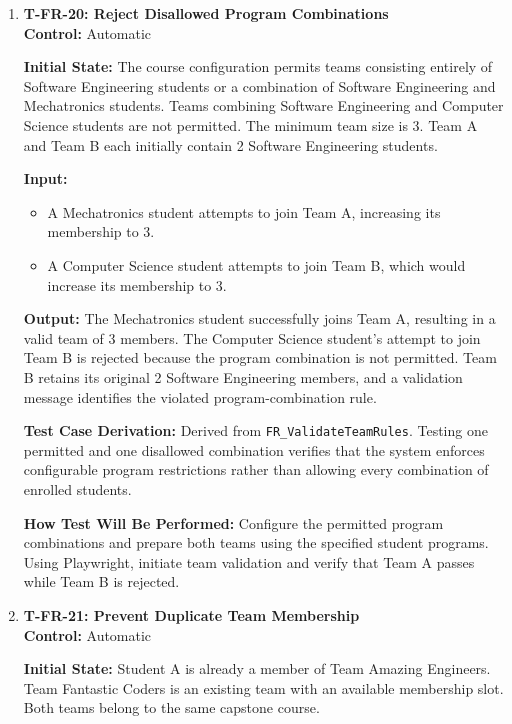 \documentclass[12pt, titlepage]{article}
\begin{document}
\begin{enumerate}
\item \label{T-FR-20}\textbf{T-FR-20: Reject Disallowed Program Combinations}\\

\textbf{Control:} Automatic

\textbf{Initial State:} The course configuration permits teams consisting entirely of Software Engineering students or a combination of Software Engineering and Mechatronics students. Teams combining Software Engineering and Computer Science students are not permitted. The minimum team size is 3. Team A and Team B each initially contain 2 Software Engineering students.

\textbf{Input:}
\begin{itemize}
    \item A Mechatronics student attempts to join Team A, increasing its membership to 3.
    \item A Computer Science student attempts to join Team B, which would increase its membership to 3.
\end{itemize}

\textbf{Output:} The Mechatronics student successfully joins Team A, resulting in a valid team of 3 members. The Computer Science student's attempt to join Team B is rejected because the program combination is not permitted. Team B retains its original 2 Software Engineering members, and a validation message identifies the violated program-combination rule.

\textbf{Test Case Derivation:} Derived from \texttt{FR\_ValidateTeamRules}. Testing one permitted and one disallowed combination verifies that the system enforces configurable program restrictions rather than allowing every combination of enrolled students.

\textbf{How Test Will Be Performed:} Configure the permitted program combinations and prepare both teams using the specified student programs. Using Playwright, initiate team validation and verify that Team A passes while Team B is rejected.

\item \label{T-FR-21}\textbf{T-FR-21: Prevent Duplicate Team Membership}\\

\textbf{Control:} Automatic

\textbf{Initial State:} Student A is already a member of Team Amazing Engineers. Team Fantastic Coders is an existing team with an available membership slot. Both teams belong to the same capstone course.


\end{enumerate}
\end{document}
